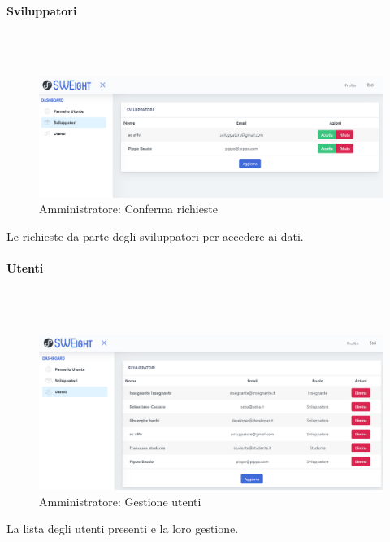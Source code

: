 		\paragraph{Sviluppatori}\mbox{}\\ \\
			\begin{figure}[H]
			\centering
			\includegraphics[width=17cm]{sez/img/amministratore/conf_ric_svil.PNG}
			\caption{Amministratore: Conferma richieste}\label{fig:1}
			\end{figure}
		  Le richieste da parte degli sviluppatori per accedere ai dati.


		\paragraph{Utenti}\mbox{}\\ \\
			\begin{figure}[H]
			\centering
			\includegraphics[width=17cm]{sez/img/amministratore/gestisciutenti.PNG}
			\caption{Amministratore: Gestione utenti}\label{fig:1}
			\end{figure}
		  La lista degli utenti presenti e la loro gestione.
